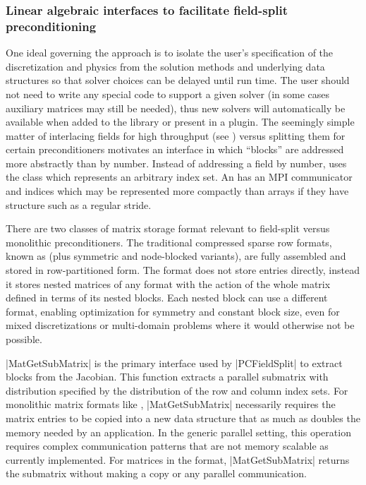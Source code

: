 \subsubsection{Linear algebraic interfaces to facilitate field-split preconditioning}
One ideal governing the {\PETSc} approach is to isolate the user's specification of the discretization and physics from the solution methods and underlying data structures so that solver choices can be delayed until run time.
The user should not need to write any special code to support a given solver (in some cases auxiliary matrices may still be needed), thus new solvers will automatically be available when added to the library or present in a plugin.
The seemingly simple matter of interlacing fields for high throughput (see ) versus splitting them for certain preconditioners motivates an interface in which ``blocks'' are addressed more abstractly than by number.
Instead of addressing a field by number, {\PETSc} uses the  class which represents an arbitrary index set.
An  has an MPI communicator and indices which may be represented more compactly than arrays if they have structure such as a regular stride.

There are two classes of matrix storage format relevant to field-split versus monolithic preconditioners.
The traditional compressed sparse row formats, known as  (plus symmetric and node-blocked variants), are fully assembled and stored in row-partitioned form.
The  format does not store entries directly, instead it stores nested matrices of any format with the action of the whole matrix defined in terms of its nested blocks.
Each nested block can use a different format, enabling optimization for symmetry and constant block size, even for mixed discretizations or multi-domain problems where it would otherwise not be possible.

\cfunc|MatGetSubMatrix| is the primary interface used by \cverb|PCFieldSplit| to extract blocks from the Jacobian.
This function extracts a parallel submatrix with distribution specified by the distribution of the row and column index sets.
For monolithic matrix formats like , \cfunc|MatGetSubMatrix| necessarily requires the matrix entries to be copied into a new data structure that as much as doubles the memory needed by an application.
In the generic parallel setting, this operation requires complex communication patterns that are not memory scalable as currently implemented.
For matrices in the  format, \cfunc|MatGetSubMatrix| returns the submatrix without making a copy or any parallel communication.

